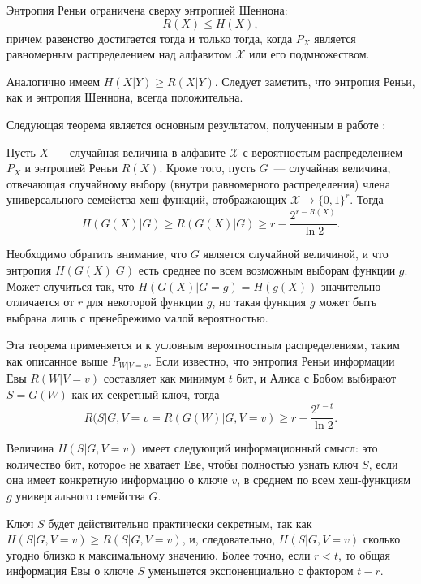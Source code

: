 \begin{statement}
  Энтропия Реньи ограничена сверху энтропией Шеннона:
  $$ R(X) \leq H(X), $$
  причем равенство достигается тогда и только тогда, когда $P_X$ является равномерным распределением над алфавитом $\mathcal{X}$ или его подмножеством.
\end{statement}

Аналогично имеем $H(X|Y) \geq R(X|Y)$. Следует заметить, что энтропия Реньи, как и энтропия Шеннона, всегда положительна.

Следующая теорема является основным результатом, полученным в работе \cite{privacy_amplification}:

\begin{theorem}
  Пусть $X$~--- случайная величина в алфавите $\mathcal{X}$ с вероятностым распределением $P_X$ и энтропией Реньи $R(X)$. Кроме того, пусть $G$~--- случайная величина, отвечающая случайному выбору (внутри равномерного распределения) члена универсального семейства хеш-функций, отображающих $\mathcal{X} \rightarrow \{0,1\}^r$. Тогда
  \begin{equation}
    H(G(X)|G) \geq R(G(X)|G) \geq r - \frac{2^{r - R(X)}}{\ln 2}.
  \end{equation}
\end{theorem}

Необходимо обратить внимание, что $G$ является случайной величиной, и что энтропия $H(G(X)|G)$ есть среднее по всем возможным выборам функции $g$. Может случиться так, что $H(G(X)|G=g) = H(g(X))$ значительно отличается от $r$ для некоторой функции $g$, но такая функция $g$ может быть выбрана лишь с пренебрежимо малой вероятностью.

Эта теорема применяется и к условным вероятностным распределениям, таким как описанное выше $P_{W|V=v}$. Если известно, что энтропия Реньи информации Евы $R(W|V=v)$ составляет как минимум $t$ бит, и Алиса с Бобом выбирают $S = G(W)$ как их секретный ключ, тогда
\begin{equation}
  R(S|G,V=v = R(G(W)|G,V=v) \geq r - \frac{2^{r - t}}{\ln 2}.
\end{equation}

Величина $H(S|G,V=v)$ имеет следующий информационный смысл: это количество бит, котороe не хватает Еве, чтобы полностью узнать ключ $S$, если она имеет конкретную информацию о ключе $v$, в среднем по всем хеш-функциям $g$ универсального семейства $G$.

Ключ $S$ будет действительно практически секретным, так как $H(S|G,V=v) \geq R(S|G,V=v)$, и, следовательно, $H(S|G,V=v)$ сколько угодно близко к максимальному значению. Более точно, если $r < t$, то общая информация Евы о ключе $S$ уменьшется экспоненциально с фактором $t-r$.






